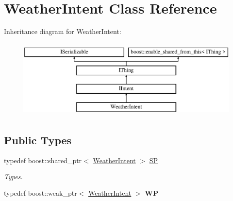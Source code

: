 \hypertarget{class_weather_intent}{}\section{Weather\+Intent Class Reference}
\label{class_weather_intent}
Inheritance diagram for Weather\+Intent\+:\begin{figure}[H]
\begin{center}
\leavevmode
\includegraphics[height=4.000000cm]{class_weather_intent}
\end{center}
\end{figure}
\subsection*{Public Types}
\begin{DoxyCompactItemize}
\item 
\mbox{\label{class_weather_intent_a16eafc3d3a59b262823dd50d9897c13c}} 
typedef boost\+::shared\+\_\+ptr$<$ \hyperlink{class_weather_intent}{Weather\+Intent} $>$ \hyperlink{class_weather_intent_a16eafc3d3a59b262823dd50d9897c13c}{SP}
\begin{DoxyCompactList}\small\item\em Types. \end{DoxyCompactList}\item 
\mbox{\label{class_weather_intent_a580aec3dd536652609c9d969cef091fc}} 
typedef boost\+::weak\+\_\+ptr$<$ \hyperlink{class_weather_intent}{Weather\+Intent} $>$ {\bfseries WP}
\end{DoxyCompactItemize}
